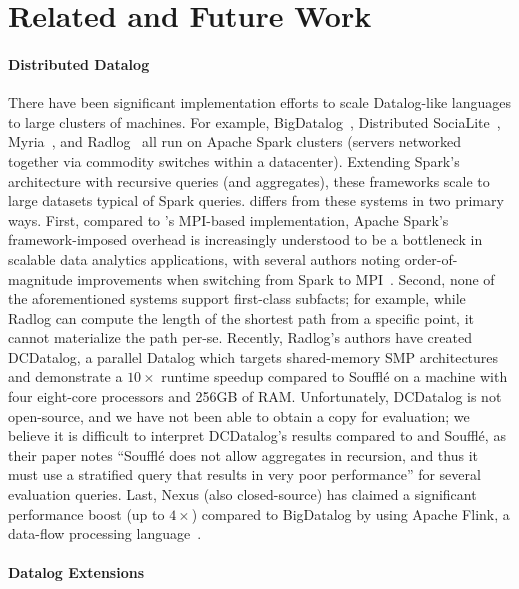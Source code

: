 \section{Related and Future Work}
\label{sec:related}

\paragraph*{Distributed Datalog}

There have been significant implementation efforts to scale
Datalog-like languages to large clusters of machines. For example,
BigDatalog~\cite{bigdl}, Distributed SociaLite~\cite{Seo:2013},
Myria~\cite{Halperin:2014}, and Radlog~\cite{Gu:2019} all run on
Apache Spark clusters (servers networked together via commodity
switches within a datacenter). Extending Spark's architecture with
recursive queries (and aggregates), these frameworks scale to large
datasets typical of Spark queries. \slog{} differs from these systems
in two primary ways. First, compared to \slog{}'s MPI-based
implementation, Apache Spark's framework-imposed overhead is
increasingly understood to be a bottleneck in scalable data analytics
applications, with several authors noting order-of-magnitude
improvements when switching from Spark to
MPI~\cite{SparkBadMPIGood,Kumar:2017,Anderson:2017}. Second,
none of the aforementioned systems support first-class subfacts; for
example, while Radlog can compute the length of the shortest path from
a specific point, it cannot materialize the path per-se. Recently,
Radlog's authors have created DCDatalog, a parallel Datalog which
targets shared-memory SMP architectures and demonstrate a $10\times$
runtime speedup compared to Souffl\'e on a machine with four
eight-core processors and 256GB of RAM. Unfortunately, DCDatalog is
not open-source, and we have not been able to obtain a copy for
evaluation; we believe it is difficult to interpret DCDatalog's
results compared to \slog{} and Souffl\'e, as their paper notes
``Souffl\'e does not allow aggregates in recursion, and thus it must
use a stratified query that results in very poor performance'' for
several evaluation queries. Last, Nexus (also closed-source) has
claimed a significant performance boost (up to $4\times$) compared to
BigDatalog by using Apache Flink, a data-flow processing
language~\cite{Muhammad:2022}.

\paragraph*{Datalog Extensions}

